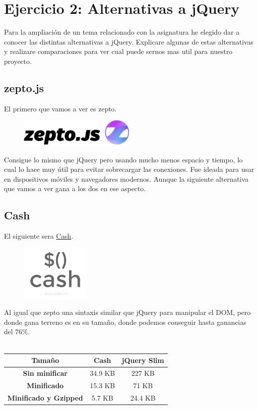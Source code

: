 \documentclass[12pt,a4paper]{article}
\begin{document}
\section{Ejercicio 2: Alternativas a jQuery}
Para la ampliación de un tema relacionado con la asignatura he elegido dar a conocer las distintas alternativas a jQuery. Explicare algunas de estas alternativas y realizare comparaciones para ver cual puede sernos mas util para nuestro proyecto.
\subsection{zepto.js}
El primero  que vamos a ver es zepto. 
\begin{figure}[H]
	\centering
	\includegraphics[width=0.5\textwidth]{images/zepto.png}
\end{figure}
Consigue lo mismo que jQuery pero usando mucho menos espacio y tiempo, lo cual lo hace muy útil para evitar sobrecargar las conexiones. Fue ideada para usar en dispositivos móviles y navegadores modernos. Aunque la siguiente alternativa que vamos a ver gana a los dos en ese aspecto.
\subsection{Cash}
 El siguiente sera \href{https://github.com/fabiospampinato/cash}{Cash}. 

\begin{figure}[H]
	\centering
	\includegraphics[width=0.3\textwidth]{images/cash.png}
\end{figure}
Al igual que zepto una sintaxis similar que jQuery para manipular el DOM, pero donde gana terreno es en su tamaño, donde podemos conseguir hasta ganancias del $76\%$.\\\\
\begin{table}[H]
	\centering
\begin{tabular}{|c|c|c|}
	\hline 
	\textbf{Tamaño} & \textbf{Cash} & \textbf{jQuery Slim} \\ 
	\hline 
	\textbf{Sin minificar} & 34.9 KB & 227 KB \\ 
	\hline 
	\textbf{Minificado} & 15.3 KB & 71 KB \\ 
	\hline 
	\textbf{Minificado y Gzipped} & 5.7 KB & 24.4 KB \\ 
	\hline 
\end{tabular} 
\end{table}
\end{document}
